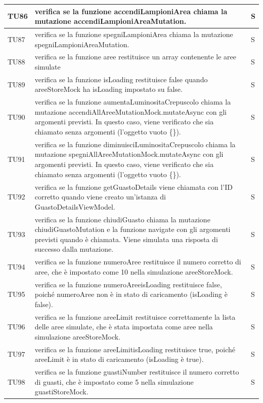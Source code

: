 \documentclass[12pt]{article}
\begin{document}
\begin{xltabular}{\linewidth}{|>{\hsize}X|X|>{\hsize}X|}
	TU86 & verifica se la funzione accendiLampioniArea chiama la mutazione accendiLampioniAreaMutation. & S \\ \hline
	TU87 & verifica se la funzione spegniLampioniArea chiama la mutazione spegniLampioniAreaMutation. & S \\ \hline
	TU88 &  verifica se la funzione aree restituisce un array contenente le aree simulate & S \\ \hline
	TU89 & verifica se la funzione isLoading restituisce false quando areeStoreMock ha isLoading impostato su false. & S \\ \hline
	TU90 & verifica se la funzione aumentaLuminositaCrepuscolo chiama la mutazione accendiAllAreeMutationMock.mutateAsync con gli argomenti previsti. In questo caso, viene verificato che sia chiamato senza argomenti (l'oggetto vuoto \{\}). & S \\ \hline
	TU91 & verifica se la funzione diminuisciLuminositaCrepuscolo chiama la mutazione spegniAllAreeMutationMock.mutateAsync con gli argomenti previsti. In questo caso, viene verificato che sia chiamato senza argomenti (l'oggetto vuoto \{\}). & S \\ \hline
	TU92 & verifica se la funzione getGuastoDetails viene chiamata con l'ID corretto quando viene creato un'istanza di GuastoDetailsViewModel. & S \\ \hline
	TU93 & verifica se la funzione chiudiGuasto chiama la mutazione chiudiGuastoMutation e la funzione navigate con gli argomenti previsti quando è chiamata. Viene simulata una risposta di successo dalla mutazione. & S \\ \hline
	TU94 & verifica se la funzione numeroAree restituisce il numero corretto di aree, che è impostato come 10 nella simulazione areeStoreMock. & S \\ \hline
	TU95 & verifica se la funzione numeroAreeisLoading restituisce false, poiché numeroAree non è in stato di caricamento (isLoading è false). & S \\ \hline
	TU96 & verifica se la funzione areeLimit restituisce correttamente la lista delle aree simulate, che è stata impostata come aree nella simulazione areeStoreMock. & S \\ \hline
	TU97 & verifica se la funzione areeLimitisLoading restituisce true, poiché areeLimit è in stato di caricamento (isLoading è true). & S \\ \hline
	TU98 & verifica se la funzione guastiNumber restituisce il numero corretto di guasti, che è impostato come 5 nella simulazione guastiStoreMock. & S \\ \hline

\end{xltabular}
\end{document}
